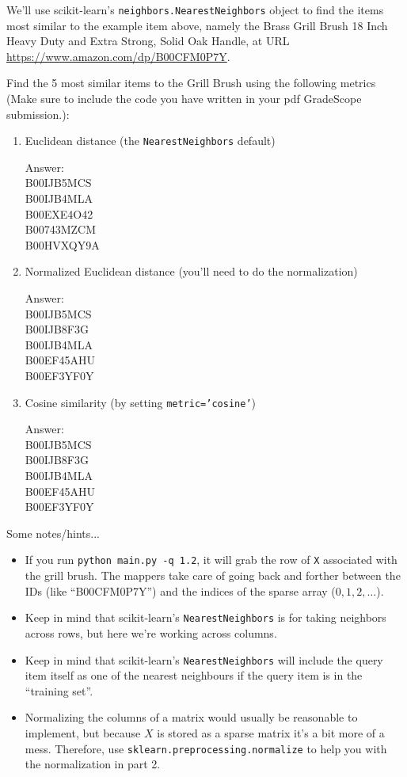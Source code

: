 \documentclass{article}
\def\ans#1{\par\gre{Answer: #1}}
\def\blu#1{{\color{blu}#1}}
\def\gre#1{{\color{gre}#1}}
\begin{document}
We'll use scikit-learn's \texttt{neighbors.NearestNeighbors} object to find the items most similar to the example item above, namely the Brass Grill Brush 18 Inch Heavy Duty and Extra Strong, Solid Oak Handle, at URL \url{https://www.amazon.com/dp/B00CFM0P7Y}.

\blu{Find the 5 most similar items to the Grill Brush using the following metrics (Make sure to include the code you have written in your pdf GradeScope submission.):}

\begin{enumerate}
\item Euclidean distance (the \texttt{NearestNeighbors} default)
\ans{\\
	B00IJB5MCS\\
	B00IJB4MLA\\
	B00EXE4O42\\
	B00743MZCM\\
	B00HVXQY9A}
\item Normalized Euclidean distance (you'll need to do the normalization)
\ans{\\
	B00IJB5MCS\\
	B00IJB8F3G\\
	B00IJB4MLA\\
	B00EF45AHU\\
	B00EF3YF0Y}
\item Cosine similarity (by setting \texttt{metric='cosine'})
\ans{\\
	B00IJB5MCS\\
	B00IJB8F3G\\
	B00IJB4MLA\\
	B00EF45AHU\\
	B00EF3YF0Y}
\end{enumerate}

Some notes/hints...

\begin{itemize}
\item If you run \texttt{python main.py -q 1.2}, it will grab the row of \texttt{X} associated with the grill brush. The mappers take care of going back and forther between the IDs (like ``B00CFM0P7Y'') and the indices of the sparse array ($0,1,2,\ldots$).
\item Keep in mind that scikit-learn's \texttt{NearestNeighbors} is for taking neighbors across rows, but here we're working across columns.
\item Keep in mind that scikit-learn's \texttt{NearestNeighbors} will include the query item itself as one of the nearest neighbours if the query item is in the ``training set''.
\item Normalizing the columns of a matrix would usually be reasonable to implement, but because $X$ is stored as a sparse matrix it's a bit more of a mess. Therefore, use \texttt{sklearn.preprocessing.normalize} to help you with the normalization in part 2.
\end{itemize}
\end{document}
